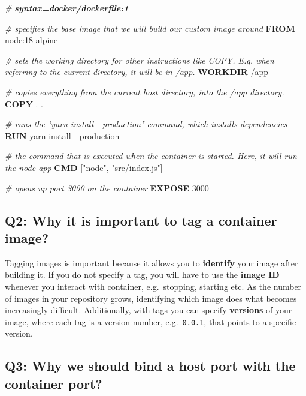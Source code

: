 \documentclass[
]{article}
\newenvironment{Shaded}{}{}
\newcommand{\AttributeTok}[1]{\textcolor[rgb]{0.49,0.56,0.16}{#1}}
\newcommand{\CommentTok}[1]{\textcolor[rgb]{0.38,0.63,0.69}{\textit{#1}}}
\newcommand{\CommentVarTok}[1]{\textcolor[rgb]{0.38,0.63,0.69}{\textbf{\textit{#1}}}}
\newcommand{\ExtensionTok}[1]{#1}
\newcommand{\KeywordTok}[1]{\textcolor[rgb]{0.00,0.44,0.13}{\textbf{#1}}}
\newcommand{\NormalTok}[1]{#1}
\newcommand{\StringTok}[1]{\textcolor[rgb]{0.25,0.44,0.63}{#1}}
\begin{document}
\begin{Shaded}
\begin{Highlighting}[]
\CommentTok{\# }\CommentVarTok{syntax=docker/dockerfile:1}

\CommentTok{\# specifies the base image that we will build our custom image around}
\KeywordTok{FROM}\NormalTok{ node:18{-}alpine }

\CommentTok{\# sets the working directory for other instructions like COPY. E.g. when referring to the current directory, it will be in /app.}
\KeywordTok{WORKDIR}\NormalTok{ /app}

\CommentTok{\# copies everything from the current host directory, into the /app directory.}
\KeywordTok{COPY}\NormalTok{ . .}

\CommentTok{\# runs the "yarn install {-}{-}production" command, which installs dependencies}
\KeywordTok{RUN} \ExtensionTok{yarn}\NormalTok{ install }\AttributeTok{{-}{-}production}

\CommentTok{\# the command that is executed when the container is started. Here, it will run the node app}
\KeywordTok{CMD}\NormalTok{ [}\StringTok{"node"}\NormalTok{, }\StringTok{"src/index.js"}\NormalTok{]}

\CommentTok{\# opens up port 3000 on the container}
\KeywordTok{EXPOSE}\NormalTok{ 3000}
\end{Highlighting}
\end{Shaded}

\hypertarget{q2-why-it-is-important-to-tag-a-container-image}{%
\subsection{Q2: Why it is important to tag a container
image?}\label{q2-why-it-is-important-to-tag-a-container-image}}

Tagging images is important because it allows you to \textbf{identify}
your image after building it. If you do not specify a tag, you will have
to use the \textbf{image ID} whenever you interact with container,
e.g.~stopping, starting etc. As the number of images in your repository
grows, identifying which image does what becomes increasingly difficult.
Additionally, with tags you can specify \textbf{versions} of your image,
where each tag is a version number, e.g.~\texttt{0.0.1}, that points to
a specific version.

\hypertarget{q3-why-we-should-bind-a-host-port-with-the-container-port}{%
\subsection{Q3: Why we should bind a host port with the container
port?}\label{q3-why-we-should-bind-a-host-port-with-the-container-port}}
\end{document}

